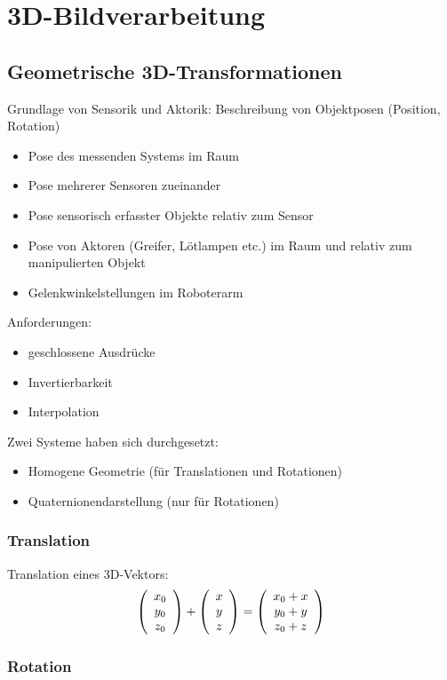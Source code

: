 
\section{3D-Bildverarbeitung}



\subsection{Geometrische 3D-Transformationen}

Grundlage von Sensorik und Aktorik: Beschreibung von Objektposen (Position, Rotation)
\begin{itemize}
\item Pose des messenden Systems im Raum
\item Pose mehrerer Sensoren zueinander
\item Pose sensorisch erfasster Objekte relativ zum Sensor
\item Pose von Aktoren (Greifer, Lötlampen etc.) im Raum und relativ zum manipulierten Objekt
\item Gelenkwinkelstellungen im Roboterarm
\end{itemize}
Anforderungen:
\begin{itemize}
\item geschlossene Ausdrücke
\item Invertierbarkeit
\item Interpolation
\end{itemize}
Zwei Systeme haben sich durchgesetzt:
\begin{itemize}
\item Homogene Geometrie (für Translationen und Rotationen)
\item Quaternionendarstellung (nur für Rotationen)
\end{itemize}

\subsubsection*{Translation}

Translation eines 3D-Vektors: $$\left( \begin{array}{c} x_0 \\ y_0 \\ z_0 \end{array} \right) + \left( \begin{array}{c} x \\ y \\ z \end{array} \right) = \left( \begin{array}{c} x_0 + x \\ y_0 + y \\ z_0 + z \end{array} \right)$$

\subsubsection*{Rotation}

